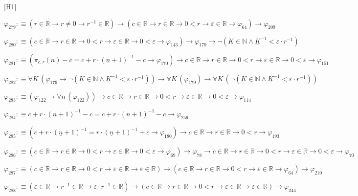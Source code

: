 \begin{fullproof}{[H1]}
\begin{abbrevlist}
\item $\varphi_{279} :\equiv (r \in \mathbb{R} \to r \neq 0 \to r^{-1} \in \mathbb{R}) \to (c \in \mathbb{R} \to r \in \mathbb{R} \to 0 < r \to \varepsilon \in \mathbb{R} \to \varphi_{64}) \to \varphi_{209}$
\item $\varphi_{280} :\equiv (c \in \mathbb{R} \to r \in \mathbb{R} \to 0 < r \to \varepsilon \in \mathbb{R} \to 0 < \varepsilon \to \varphi_{143}) \to \varphi_{179} \to \neg (K \in \mathbb{N} \land \underline{K}^{-1} < \varepsilon \cdot r^{-1})$
\item $\varphi_{281} :\equiv (\pi_{c,r}(n) - c = c + r \cdot (\underline{n} + 1)^{-1} - c \to \varphi_{170}) \to c \in \mathbb{R} \to r \in \mathbb{R} \to 0 < r \to \varepsilon \in \mathbb{R} \to 0 < \varepsilon \to \varphi_{151}$
\item $\varphi_{282} :\equiv \forall K\,(\varphi_{179} \to \neg (K \in \mathbb{N} \land \underline{K}^{-1} < \varepsilon \cdot r^{-1})) \to \forall K\,(\varphi_{179}) \to \forall K\,(\neg (K \in \mathbb{N} \land \underline{K}^{-1} < \varepsilon \cdot r^{-1}))$
\item $\varphi_{283} :\equiv (\varphi_{122} \to \forall n\,(\varphi_{122})) \to c \in \mathbb{R} \to r \in \mathbb{R} \to 0 < r \to \varepsilon \in \mathbb{R} \to 0 < \varepsilon \to \varphi_{114}$
\item $\varphi_{284} :\equiv c + r \cdot (\underline{n} + 1)^{-1} - c = c + r \cdot (\underline{n} + 1)^{-1} - c \to \varphi_{259}$
\item $\varphi_{285} :\equiv (c + r \cdot (\underline{n} + 1)^{-1} = r \cdot (\underline{n} + 1)^{-1} + c \to \varphi_{180}) \to c \in \mathbb{R} \to r \in \mathbb{R} \to 0 < r \to \varphi_{193}$
\item $\varphi_{286} :\equiv (c \in \mathbb{R} \to r \in \mathbb{R} \to 0 < r \to \varepsilon \in \mathbb{R} \to 0 < \varepsilon \to \varphi_{69}) \to \varphi_{78} \to c \in \mathbb{R} \to r \in \mathbb{R} \to 0 < r \to \varepsilon \in \mathbb{R} \to 0 < \varepsilon \to \varphi_{70}$
\item $\varphi_{287} :\equiv (c \in \mathbb{R} \to r \in \mathbb{R} \to 0 < r \to \varepsilon \in \mathbb{R} \to \varepsilon \in \mathbb{R}) \to (c \in \mathbb{R} \to r \in \mathbb{R} \to 0 < r \to \varepsilon \in \mathbb{R} \to \varphi_{64}) \to \varphi_{210}$
\item $\varphi_{288} :\equiv (\varepsilon \in \mathbb{R} \to r^{-1} \in \mathbb{R} \to \varepsilon \cdot r^{-1} \in \mathbb{R}) \to (c \in \mathbb{R} \to r \in \mathbb{R} \to 0 < r \to \varepsilon \in \mathbb{R} \to \varepsilon \in \mathbb{R}) \to \varphi_{244}$

\end{abbrevlist}
\end{fullproof}
